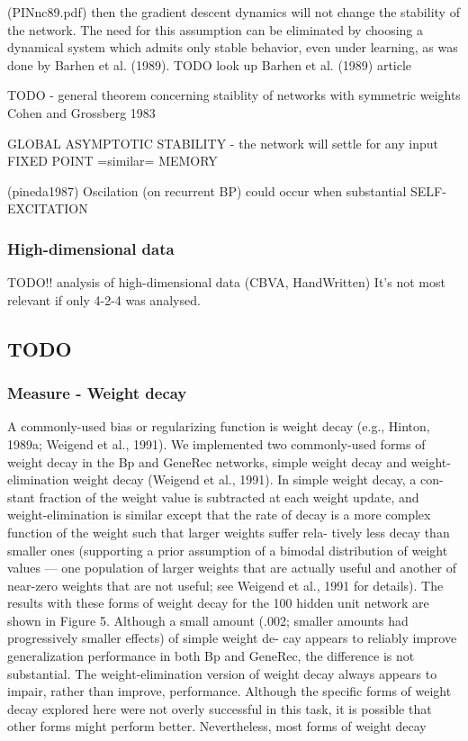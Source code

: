 (PINnc89.pdf) then the gradient descent dynamics will not change the stability of the network. The need
for this assumption can be eliminated by choosing a dynamical system
which admits only stable behavior, even under learning, as was done by
Barhen et al. (1989). TODO look up Barhen et al. (1989) article 

TODO - general theorem concerning staiblity of networks with symmetric weights Cohen and Grossberg 1983 

GLOBAL ASYMPTOTIC STABILITY - the network will settle for any input 
FIXED POINT =similar= MEMORY

(pineda1987) Oscilation (on recurrent BP) could occur when substantial SELF-EXCITATION 

\subsubsection{High-dimensional data} 
TODO!! analysis of high-dimensional data (CBVA, HandWritten) 
It's not most relevant if only 4-2-4 was analysed. 

\subsection{TODO} 

\subsubsection{Measure - Weight decay}
A commonly-used bias or regularizing function is weight decay (e.g., Hinton, 1989a; Weigend et al., 1991).
We implemented two commonly-used forms of weight decay in the Bp and GeneRec networks, simple
weight decay and weight-elimination weight decay (Weigend et al., 1991). In simple weight decay, a con-
stant fraction of the weight value is subtracted at each weight update, and weight-elimination is similar
except that the rate of decay is a more complex function of the weight such that larger weights suffer rela-
tively less decay than smaller ones (supporting a prior assumption of a bimodal distribution of weight values
— one population of larger weights that are actually useful and another of near-zero weights that are not
useful; see Weigend et al., 1991 for details).
The results with these forms of weight decay for the 100 hidden unit network are shown in Figure 5.
Although a small amount (.002; smaller amounts had progressively smaller effects) of simple weight de-
cay appears to reliably improve generalization performance in both Bp and GeneRec, the difference is not
substantial. The weight-elimination version of weight decay always appears to impair, rather than improve,
performance. Although the specific forms of weight decay explored here were not overly successful in
this task, it is possible that other forms might perform better. Nevertheless, most forms of weight decay
\cite{o2001generalization} 

